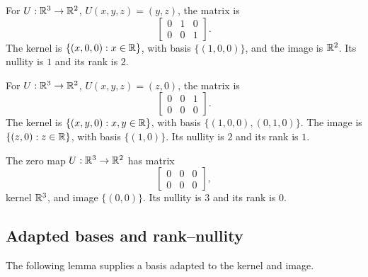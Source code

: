 \begin{example}
  For \(U:\mathbb{R}^3\to\mathbb{R}^2\), \(U(x,y,z)=(y,z)\), the matrix is
  \[
    \begin{bmatrix}0&1&0\\0&0&1\end{bmatrix}.
  \]
  The kernel is \(\{(x,0,0):x\in\mathbb{R}\}\), with basis \(\{(1,0,0)\}\),
  and the image is \(\mathbb{R}^2\). Its nullity is \(1\) and its rank is \(2\).
\end{example}

\begin{example}
  For \(U:\mathbb{R}^3\to\mathbb{R}^2\), \(U(x,y,z)=(z,0)\), the matrix is
  \[
    \begin{bmatrix}0&0&1\\0&0&0\end{bmatrix}.
  \]
  The kernel is \(\{(x,y,0):x,y\in\mathbb{R}\}\), with basis
  \(\{(1,0,0),(0,1,0)\}\). The image is \(\{(z,0):z\in\mathbb{R}\}\),
  with basis \(\{(1,0)\}\). Its nullity is \(2\) and its rank is \(1\).
\end{example}

\begin{example}
  The zero map \(U:\mathbb{R}^3\to\mathbb{R}^2\) has matrix
  \[
    \begin{bmatrix}0&0&0\\0&0&0\end{bmatrix},
  \]
  kernel \(\mathbb{R}^3\), and image \(\{(0,0)\}\). Its nullity is \(3\)
  and its rank is \(0\).
\end{example}

\subsection{Adapted bases and rank--nullity}

The following lemma supplies a basis adapted to the kernel and image.

